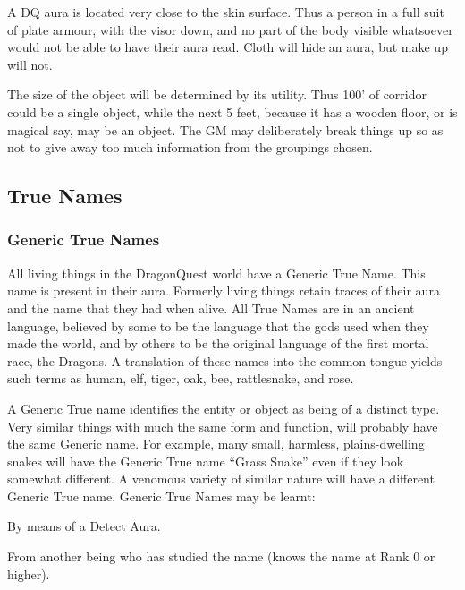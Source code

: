 \begin{multicols*}{3}
\begin{Enumerate}
\item
A DQ aura is located very close to the skin surface.  Thus a person in
a full suit of plate armour, with the visor down, and no part of the
body visible whatsoever would not be able to have their aura
read. Cloth will hide an aura, but make up will not.

\item
The size of the object will be determined by its utility. Thus 100' of
corridor could be a single object, while the next 5 feet, because it
has a wooden floor, or is magical say, may be an object. The GM may
deliberately break things up so as not to give away too much
information from the groupings chosen.
\end{Enumerate}

\subsection{True Names}

\label{names}

\subsubsection{Generic True Names}

All living things in the DragonQuest world have a Generic True
Name. This name is present in their aura. Formerly living things
retain traces of their aura and the name that they had when alive. All
True Names are in an ancient language, believed by some to be the
language that the gods used when they made the world, and by others to
be the original language of the first mortal race, the Dragons. A
translation of these names into the common tongue yields such terms as
human, elf, tiger, oak, bee, rattlesnake, and rose.

A Generic True name identifies the entity or object as being of a
distinct type. Very similar things with much the same form and
function, will probably have the same Generic name. For example, many
small, harmless, plains-dwelling snakes will have the Generic True
name ``Grass Snake'' even if they look somewhat different. A venomous
variety of similar nature will have a different Generic True name.
Generic True Names may be learnt:
\begin{Itemize}
\item By means of a Detect Aura.

\item From another being who has studied the name (\eg knows the name
at Rank 0 or higher).
\end{Itemize}


\end{multicols*}
